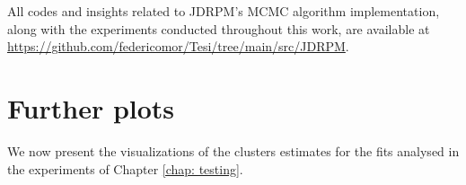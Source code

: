 \documentclass[12pt,	%
	a4paper,		%
	twoside,		%
	openright,		%
	titlepage,%
	]{book}
\theoremstyle{definition}
\begin{document}
All codes and insights related to JDRPM's MCMC algorithm implementation, along with the experiments conducted throughout this work, are available at \url{https://github.com/federicomor/Tesi/tree/main/src/JDRPM}.



\chapter{Further plots}
\label{cap:further plots}

We now present the visualizations of the clusters estimates for the fits analysed in the experiments of Chapter \ref{chap: testing}.

\end{document}

